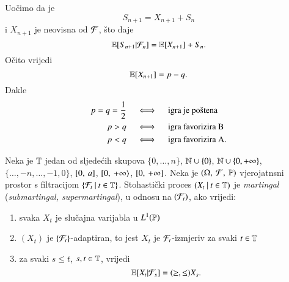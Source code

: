 \begin{pr}
    Uo\v cimo da je
    \begin{equation*}
        S_{n + 1} = X_{n + 1} + S_n
    \end{equation*}
    i $X_{n + 1}$ je neovisna od $\mathcal{F}$, \v sto daje
    \begin{equation*}
        \mathbb{E} [S_{n + 1} | \mathcal{F}_n] = \mathbb{E} [X_{n + 1}] + S_n.
    \end{equation*}
    O\v cito vrijedi
    \begin{equation*}
        \mathbb{E} [X_{n + 1}] = p - q.
    \end{equation*}
    Dakle
    \begin{equation}    \label{jed:23.3}
        \begin{aligned}
            p = q = \frac{1}{2} \quad &\iff \quad \textnormal{igra je po\v stena}\\
            p > q \quad &\iff \quad \textnormal{igra favorizira B}\\
            p < q \quad &\iff \quad \textnormal{igra favorizira A}.
        \end{aligned}
    \end{equation}
\end{pr}

\begin{defn}    \label{defn:23.4}
    Neka je $\mathbb{T}$ jedan od sljede\' cih skupova $\{ 0, \ldots, n \}$, $\mathbb{N} \cup \{0\}$, $\mathbb{N} \cup \{0, +\infty\}$, $\{ \ldots, -n, \ldots, -1, 0\}$, $[{0}, \:{a}]$, $[ {0}, \: {+\infty} \rangle$, $[{0}, \:{+\infty}]$.
    Neka je $(\Omega, \: \mathcal{F}, \: \mathbb{P})$ vjerojatnsni prostor s filtracijom $\{{\mathcal{F}_t} \: | \: {t \in \mathbb{T}}\}$.
    Stohasti\v cki proces $({X_t} \: | \: {t \in \mathbb{T}})$ je \emph{martingal} (\emph{submartingal, supermartingal}), u odnosu na $(\mathcal{F}_t)$, ako vrijedi:
    \begin{enumerate}[label=(\alph*)]
        \item   \label{defn:23.4.1}
        svaka $X_t$ je slu\v cajna varijabla u $L^1 (\mathbb{P})$
        \item   \label{defn:23.4.2}
        $(X_t)$ je $\{\mathcal{F}_t\}$-adaptiran, to jest $X_t$ je $\mathcal{F}_t$-izmjeriv za svaki $t \in \mathbb{T}$
        \item   \label{defn:23.4.3}
        za svaki $s \leq t$, $s, t \in \mathbb{T}$, vrijedi
        \begin{equation*}
            \mathbb{E} [X_t | \mathcal{F}_s] = (\geq, \leq ) X_s.
        \end{equation*}
    \end{enumerate}
\end{defn}

